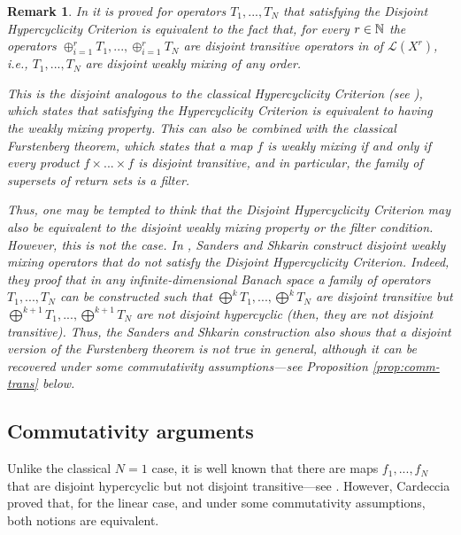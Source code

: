 \documentclass[11pt,reqno]{article}
\newtheorem{remark}[statement]{Remark}
\def\NN{\Bbb N}
\def\eor{\hfill{\circledR}}
\begin{document}
\begin{remark}
\rm In \cite[Theorem 2.7]{BesPeris07} it is proved for operators $T_1,...,T_N$ that satisfying the Disjoint Hypercyclicity Criterion is equivalent to the fact that, for every $r\in \NN$ the operators $\oplus_{i=1}^r T_1,..., \oplus_{i=1}^r T_N$ are disjoint transitive operators in of $\mathcal{L}(X^r)$, {i.e., $T_1,...,T_N$ are disjoint weakly mixing of any order.} 
 
 This \cite[Theorem 2.7]{BesPeris07} is the disjoint analogous to the classical Hypercyclicity Criterion (see \cite{BePe99}),
  which states that satisfying the Hypercyclicity Criterion is equivalent to having the weakly mixing property. This can also be combined with the classical Furstenberg theorem, which states that a map $f$ is weakly mixing if and only if every product $f\times...\times f$ is disjoint transitive, and in particular, the family of supersets of return sets is a filter.
  
  Thus, one may be tempted to think that the Disjoint Hypercyclicity Criterion may also be equivalent to the disjoint weakly mixing property or the filter condition. However, this is not the case. In \cite{SanShk14}, Sanders and Shkarin construct disjoint weakly mixing operators that do not satisfy the Disjoint Hypercyclicity Criterion. Indeed, they proof that in any infinite-dimensional Banach space a family of operators $T_1,...,T_N$ can be constructed such that $\bigoplus^k T_1,...,\bigoplus^k T_N$ are disjoint transitive but $\bigoplus^{k+1} T_1,...,\bigoplus^{k+1} T_N$ are not disjoint hypercyclic (then, they are not disjoint transitive). Thus, the Sanders and Shkarin construction also shows that a disjoint version of the Furstenberg theorem is not true in general, although it can be recovered under some commutativity assumptions---see Proposition \ref{prop:comm-trans} below.  \eor
\end{remark}




\subsection{Commutativity arguments}\label{subsec:commutativity}

Unlike the classical $N=1$ case, it is well known that there are maps $f_1,...,f_N$ that are disjoint hypercyclic but not disjoint transitive---see \cite[Corollary 3.5]{SanShk14}. However, Cardeccia proved that, for the linear case, and under some commutativity assumptions, both notions are equivalent.
\end{document}
